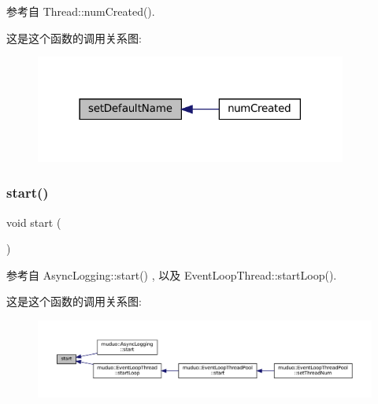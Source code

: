 参考自 Thread\+::num\+Created().

这是这个函数的调用关系图\+:
\nopagebreak
\begin{figure}[H]
\begin{center}
\leavevmode
\includegraphics[width=290pt]{classmuduo_1_1Thread_a7ac088202ebd97d9b4f69b46341a3142_icgraph}
\end{center}
\end{figure}
\mbox{\label{classmuduo_1_1Thread_a60de64d75454385b23995437f1d72669}} 
\subsubsection{\texorpdfstring{start()}{start()}}
{\footnotesize\ttfamily void start (\begin{DoxyParamCaption}{ }\end{DoxyParamCaption})}



参考自 Async\+Logging\+::start() , 以及 Event\+Loop\+Thread\+::start\+Loop().

这是这个函数的调用关系图\+:
\nopagebreak
\begin{figure}[H]
\begin{center}
\leavevmode
\includegraphics[width=350pt]{classmuduo_1_1Thread_a60de64d75454385b23995437f1d72669_icgraph}
\end{center}
\end{figure}
\mbox{\label{classmuduo_1_1Thread_ae64a8595ddd43477f87ff91d9f051058}} 
